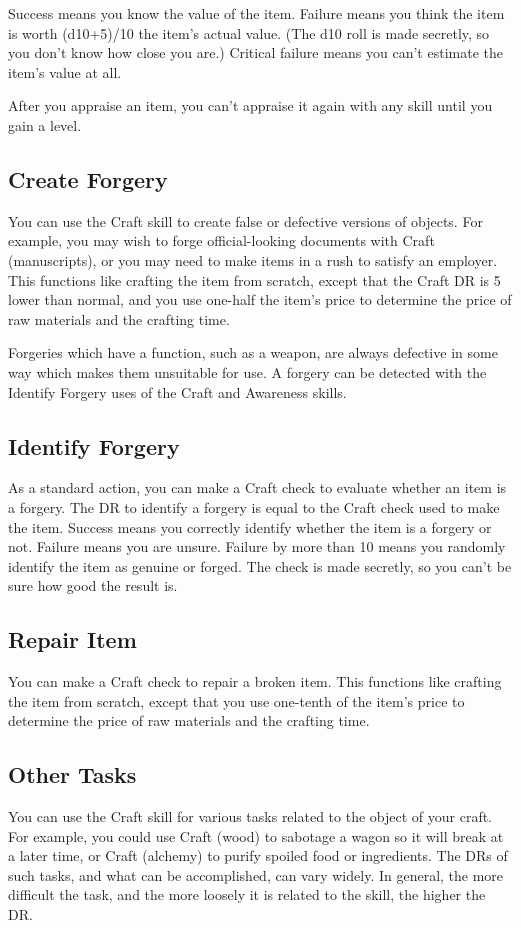         Success means you know the value of the item. Failure means you think the item is worth (d10+5)/10 \mtimes the item's actual value. (The d10 roll is made secretly, so you don't know how close you are.) Critical failure means you can't estimate the item's value at all.

        After you appraise an item, you can't appraise it again with any skill until you gain a level.

    \subsection{Create Forgery}
        You can use the Craft skill to create false or defective versions of objects. For example, you may wish to forge official-looking documents with Craft (manuscripts), or you may need to make items in a rush to satisfy an employer. This functions like crafting the item from scratch, except that the Craft DR is 5 lower than normal, and you use one-half the item's price to determine the price of raw materials and the crafting time.

        Forgeries which have a function, such as a weapon, are always defective in some way which makes them unsuitable for use. A forgery can be detected with the Identify Forgery uses of the Craft and Awareness skills.

    \subsection{Identify Forgery}
        As a standard action, you can make a Craft check to evaluate whether an item is a forgery. The DR to identify a forgery is equal to the Craft check used to make the item. Success means you correctly identify whether the item is a forgery or not. Failure means you are unsure. Failure by more than 10 means you randomly identify the item as genuine or forged. The check is made secretly, so you can't be sure how good the result is.

    \subsection{Repair Item}
        You can make a Craft check to repair a broken item. This functions like crafting the item from scratch, except that you use one-tenth of the item's price to determine the price of raw materials and the crafting time.

    \subsection{Other Tasks}
        You can use the Craft skill for various tasks related to the object of your craft. For example, you could use Craft (wood) to sabotage a wagon so it will break at a later time, or Craft (alchemy) to purify spoiled food or ingredients. The DRs of such tasks, and what can be accomplished, can vary widely. In general, the more difficult the task, and the more loosely it is related to the skill, the higher the DR\@.

